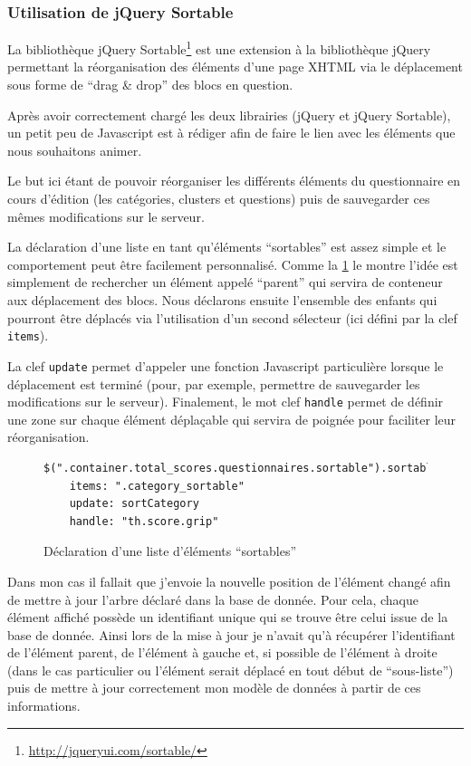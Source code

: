 \documentclass[12pt,a4paper]{book}
\begin{document}
\subsubsection{Utilisation de jQuery Sortable}

La bibliothèque jQuery Sortable\footnote{\url{http://jqueryui.com/sortable/}} est une extension à la bibliothèque jQuery permettant la réorganisation des éléments d'une page XHTML via le déplacement sous forme de ``drag \& drop'' des blocs en question.

Après avoir correctement chargé les deux librairies (jQuery et jQuery Sortable), un petit peu de Javascript est à rédiger afin de faire le lien avec les éléments que nous souhaitons animer.

Le but ici étant de pouvoir réorganiser les différents éléments du questionnaire en cours d'édition (les catégories, clusters et questions) puis de sauvegarder ces mêmes modifications sur le serveur.

La déclaration d'une liste en tant qu'éléments ``sortables'' est assez simple et le comportement peut être facilement personnalisé. Comme la \cref{fig.sort1} le montre l'idée est simplement de rechercher un élément appelé ``parent'' qui servira de conteneur aux déplacement des blocs. Nous déclarons ensuite l'ensemble des enfants qui pourront être déplacés via l'utilisation d'un second sélecteur (ici défini par la clef \texttt{items}).

La clef \texttt{update} permet d'appeler une fonction Javascript particulière lorsque le déplacement est terminé (pour, par exemple, permettre de sauvegarder les modifications sur le serveur). Finalement, le mot clef \texttt{handle} permet de définir une zone sur chaque élément déplaçable qui servira de poignée pour faciliter leur réorganisation.

\begin{figure}[h]
\begin{lstlisting}
$(".container.total_scores.questionnaires.sortable").sortable
    items: ".category_sortable"
    update: sortCategory
    handle: "th.score.grip"
\end{lstlisting}
 \caption{Déclaration d'une liste d'éléments ``sortables''}
 \label{fig.sort1}
\end{figure}

Dans mon cas il fallait que j'envoie la nouvelle position de l'élément changé afin de mettre à jour l'arbre déclaré dans la base de donnée. Pour cela, chaque élément affiché possède un identifiant unique qui se trouve être celui issue de la base de donnée. Ainsi lors de la mise à jour je n'avait qu'à récupérer l'identifiant de l'élément parent, de l'élément à gauche et, si possible de l'élément à droite (dans le cas particulier ou l'élément serait déplacé en tout début de ``sous-liste'') puis de mettre à jour correctement mon modèle de données à partir de ces informations.
\end{document}
